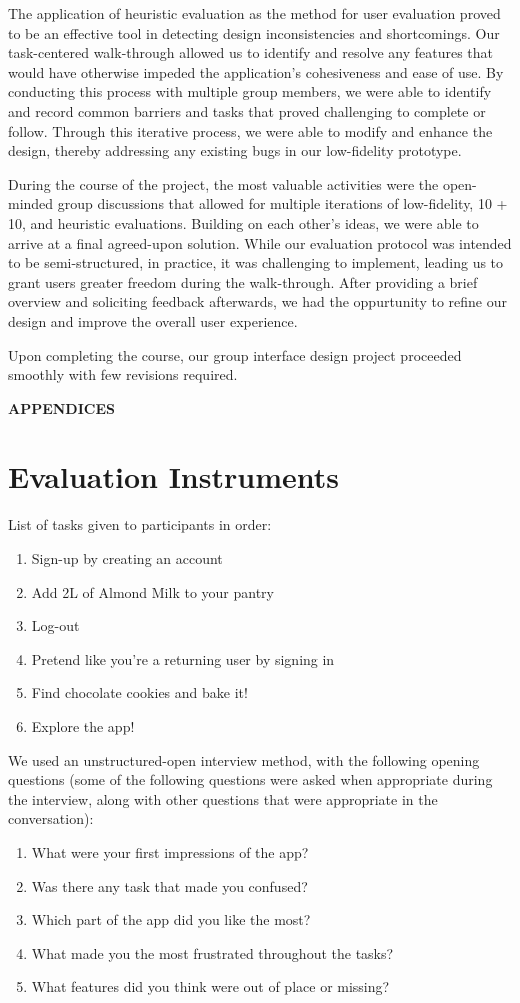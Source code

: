 \documentclass[manuscript, screen, nonacm]{acmart}
\begin{document}
The application of heuristic evaluation as the method for user evaluation proved to be an effective tool in detecting design inconsistencies and shortcomings. Our task-centered walk-through allowed us to identify and resolve any features that would have otherwise impeded the application's cohesiveness and ease of use. By conducting this process with multiple group members, we were able to identify and record common barriers and tasks that proved challenging to complete or follow. Through this iterative process, we were able to modify and enhance the design, thereby addressing any existing bugs in our low-fidelity prototype.

During the course of the project, the most valuable activities were the open-minded group discussions that allowed for multiple iterations of low-fidelity, 10 + 10, and heuristic evaluations. Building on each other's ideas, we were able to arrive at a final agreed-upon solution. While our evaluation protocol was intended to be semi-structured, in practice, it was challenging to implement, leading us to grant users greater freedom during the walk-through. After providing a brief overview and soliciting feedback afterwards, we had the oppurtunity to refine our design and improve the overall user experience.

Upon completing the course, our group interface design project proceeded smoothly with few revisions required. %


\newpage
\appendix
\noindent\textbf{APPENDICES}


\section{Evaluation Instruments}
List of tasks given to participants in order: 
\begin{enumerate}
    \item Sign-up by creating an account
    \item Add 2L of Almond Milk to your pantry
    \item Log-out
    \item Pretend like you’re a returning user by signing in
    \item Find chocolate cookies and bake it!
    \item Explore the app!
\end{enumerate}
We used an unstructured-open interview method, with the following opening questions (some of the following questions were asked when appropriate during the interview, along with other questions that were appropriate in the conversation):
\begin{enumerate}
    \item What were your first impressions of the app?
    \item Was there any task that made you confused?
    \item Which part of the app did you like the most?
    \item What made you the most frustrated throughout the tasks?
    \item What features did you think were out of place or missing?
\end{enumerate}
\end{document}
